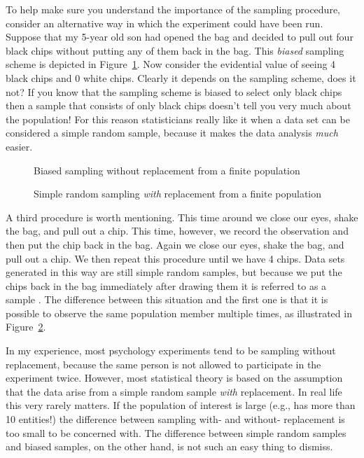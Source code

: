 To help make sure you understand the importance of the sampling procedure, consider an alternative way in which the experiment could have been run. Suppose that my 5-year old son had opened the bag and decided to pull out four black chips without putting any of them back in the bag. This {\it biased} sampling scheme is depicted in Figure~\ref{fig:brs}. Now consider the evidential value of seeing 4 black chips and 0 white chips. Clearly it depends on the sampling scheme, does it not? If you know that the sampling scheme is biased to select only black chips then a sample that consists of only black chips doesn't tell you very much about the population! For this reason statisticians really like it when a data set can be considered a simple random sample, because it makes the data analysis {\it much} easier.  

\begin{figure}[t]
\begin{center}
\end{center}
\caption{Biased sampling without replacement from a finite population}
\label{fig:brs}
\end{figure}

\begin{figure}[t]
\begin{center}
\end{center}
\caption{Simple random sampling {\it with} replacement from a finite population}
\label{fig:srs2}
\end{figure}

A third procedure is worth mentioning. This time around we close our eyes, shake the bag, and pull out a chip. This time, however, we record the observation and then put the chip back in the bag. Again we close our eyes, shake the bag, and pull out a chip. We then repeat this procedure until we have 4 chips. Data sets generated in this way are still simple random samples, but because we put the chips back in the bag immediately after drawing them it is referred to as a sample . The difference between this situation and the first one is that it is possible to observe the same population member multiple times, as illustrated in Figure~\ref{fig:srs2}. 

In my experience, most psychology experiments tend to be sampling without replacement, because the same person is not allowed to participate in the experiment twice. However, most statistical theory is based on the assumption that the data arise from a simple random sample {\it with} replacement. In real life this very rarely matters. If the population of interest is large (e.g., has more than 10 entities!) the difference between sampling with- and without- replacement is too small to be concerned with. The difference between simple random samples and biased samples, on the other hand, is not such an easy thing to dismiss.

